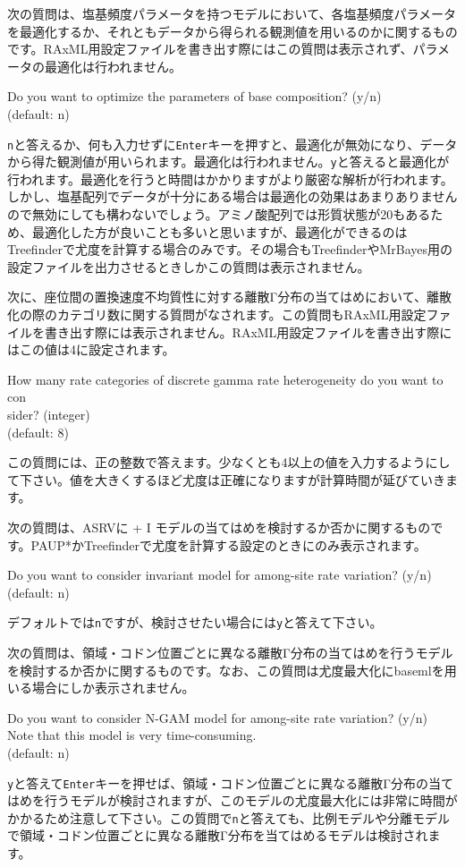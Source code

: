 \documentclass[titlepage,10pt,a4paper]{jsbook}
\newenvironment{cmd}{\begin{oframed}\raggedright\ttfamily\footnotesize\setlength{\baselineskip}{1.4em}}{\end{oframed}\vspace{-1em}}
\begin{document}
次の質問は、塩基頻度パラメータを持つモデルにおいて、各塩基頻度パラメータを最適化するか、それともデータから得られる観測値を用いるのかに関するものです。RAxML用設定ファイルを書き出す際にはこの質問は表示されず、パラメータの最適化は行われません。
\begin{cmd}
Do you want to optimize the parameters of base composition? (y/n)\\
(default: n)
\end{cmd}
\texttt{n}と答えるか、何も入力せずに\texttt{Enter}キーを押すと、最適化が無効になり、データから得た観測値が用いられます。最適化は行われません。\texttt{y}と答えると最適化が行われます。最適化を行うと時間はかかりますがより厳密な解析が行われます。しかし、塩基配列でデータが十分にある場合は最適化の効果はあまりありませんので無効にしても構わないでしょう。アミノ酸配列では形質状態が20もあるため、最適化した方が良いことも多いと思いますが、最適化ができるのはTreefinderで尤度を計算する場合のみです。その場合もTreefinderやMrBayes用の設定ファイルを出力させるときしかこの質問は表示されません。

次に、座位間の置換速度不均質性に対する離散Γ分布の当てはめにおいて、離散化の際のカテゴリ数に関する質問がなされます。この質問もRAxML用設定ファイルを書き出す際には表示されません。RAxML用設定ファイルを書き出す際にはこの値は4に設定されます。
\begin{cmd}
How many rate categories of discrete gamma rate heterogeneity do you want to con\\
sider? (integer)\\
(default: 8)
\end{cmd}
この質問には、正の整数で答えます。少なくとも4以上の値を入力するようにして下さい。値を大きくするほど尤度は正確になりますが計算時間が延びていきます。

次の質問は、ASRVに + I モデルの当てはめを検討するか否かに関するものです。PAUP*かTreefinderで尤度を計算する設定のときにのみ表示されます。
\begin{cmd}
Do you want to consider invariant model for among-site rate variation? (y/n)\\
(default: n)
\end{cmd}
デフォルトでは\texttt{n}ですが、検討させたい場合には\texttt{y}と答えて下さい。

次の質問は、領域・コドン位置ごとに異なる離散Γ分布の当てはめを行うモデルを検討するか否かに関するものです。なお、この質問は尤度最大化にbasemlを用いる場合にしか表示されません。
\begin{cmd}
Do you want to consider N-GAM model for among-site rate variation? (y/n)\\
Note that this model is very time-consuming.\\
(default: n)
\end{cmd}
\texttt{y}と答えて\texttt{Enter}キーを押せば、領域・コドン位置ごとに異なる離散Γ分布の当てはめを行うモデルが検討されますが、このモデルの尤度最大化には非常に時間がかかるため注意して下さい。この質問で\texttt{n}と答えても、比例モデルや分離モデルで領域・コドン位置ごとに異なる離散Γ分布を当てはめるモデルは検討されます。
\end{document}
